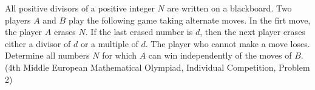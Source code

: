 All positive divisors of a positive integer $N$ are written on a blackboard. Two players $A$ and $B$ play the following game taking alternate moves. In the firt move, the player $A$ erases $N$. If the last erased number is $d$,  then the next player erases either a divisor of $d$ or a multiple of $d$. The player who cannot make a move loses. Determine all numbers $N$ for which $A$ can win independently of the moves of $B$.(4th Middle European Mathematical Olympiad, Individual Competition, Problem 2)